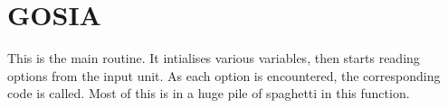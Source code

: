 \section{GOSIA}
\label{sect:gosia}

\noindent This is the main routine. It intialises various variables, then starts reading
options from the input unit. As each option is encountered, the corresponding code is
called. Most of this is in a huge pile of spaghetti in this function.\\
